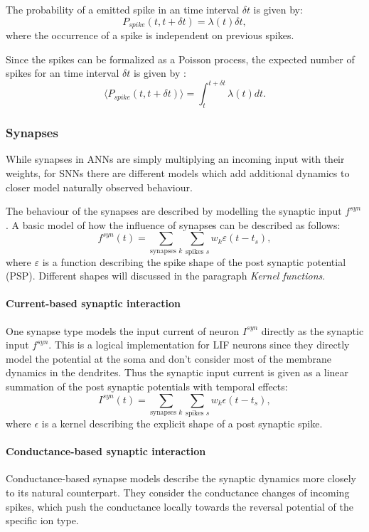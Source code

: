The probability of a emitted spike in an time interval $\delta t$ is given by: 
\[
P_{spike}({t , t+ \delta t}) = \lambda(t) \delta t,
\]
where the occurrence of a spike is independent on previous spikes. 

Since the spikes can be formalized as a Poisson process, the expected number of spikes for an time interval $\delta t$ is given by :
\[
\langle  P_{spike}({t , t+ \delta t}) \rangle = \int_t^{t + \delta t} \lambda(t) dt.
\]


\subsubsection{Synapses}

While synapses in ANNs are simply multiplying an incoming input with their weights, for SNNs there are different models which add additional dynamics to closer model naturally observed behaviour. 

The behaviour of the synapses are described by modelling the synaptic input $f^{syn}$. A basic model of how the influence of synapses can be described as follows:
\[
f^{syn}(t) = \sum_{\text{synapses } k } \sum_{\text{spikes } s} w_k \varepsilon(t - t_s),
\]
where $\varepsilon$ is a function describing the spike shape of the post synaptic potential (PSP).
Different shapes will discussed in the paragraph \textit{Kernel functions}.

\paragraph{Current-based synaptic interaction} 
One synapse type models the input current of neuron $I^{syn}$ directly as the synaptic input $f^{syn}$. This is a logical implementation for LIF neurons since they directly model the potential at the soma and don't consider most of the membrane dynamics in the dendrites. 
Thus the synaptic input current is given as a linear summation of the post synaptic potentials with temporal effects:
\[
I^{syn}(t) = \sum_{\text{synapses } k } \sum_{\text{spikes } s} w_k \epsilon(t - t_s),
\]
where $\epsilon$ is a kernel describing the explicit shape of a post synaptic spike.

\paragraph{Conductance-based synaptic interaction} 
Conductance-based synapse models describe the synaptic dynamics more closely to its natural counterpart. They consider the conductance changes of incoming spikes, which push the conductance locally towards the reversal potential of the specific ion type. 

